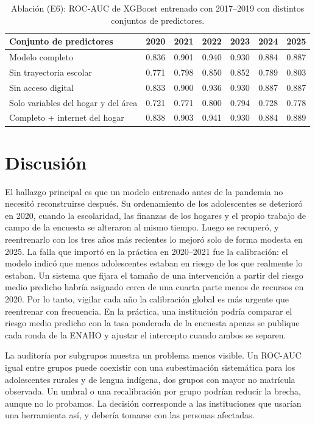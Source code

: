 \documentclass[conference]{IEEEtran}
\begin{document}
\begin{table}[t]
\caption{Ablación (E6): ROC-AUC de XGBoost entrenado con 2017--2019 con distintos conjuntos de predictores.}
\label{tab:abl}
\centering
\setlength{\tabcolsep}{2.4pt}
\scriptsize
\begin{tabular}{lcccccc}
\toprule
Conjunto de predictores & 2020 & 2021 & 2022 & 2023 & 2024 & 2025 \\
\midrule
Modelo completo & 0.836 & 0.901 & 0.940 & 0.930 & 0.884 & 0.887 \\
Sin trayectoria escolar & 0.771 & 0.798 & 0.850 & 0.852 & 0.789 & 0.803 \\
Sin acceso digital & 0.833 & 0.900 & 0.936 & 0.930 & 0.887 & 0.887 \\
Solo variables del hogar y del área & 0.721 & 0.771 & 0.800 & 0.794 & 0.728 & 0.778 \\
Completo + internet del hogar & 0.838 & 0.903 & 0.941 & 0.930 & 0.884 & 0.889 \\
\bottomrule
\end{tabular}
\end{table}

\section{Discusión}

El hallazgo principal es que un modelo entrenado antes de la pandemia no necesitó reconstruirse después. Su ordenamiento de los adolescentes se deterioró en 2020, cuando la escolaridad, las finanzas de los hogares y el propio trabajo de campo de la encuesta se alteraron al mismo tiempo. Luego se recuperó, y reentrenarlo con los tres años más recientes lo mejoró solo de forma modesta en 2025. La falla que importó en la práctica en 2020--2021 fue la calibración: el modelo indicó que menos adolescentes estaban en riesgo de los que realmente lo estaban. Un sistema que fijara el tamaño de una intervención a partir del riesgo medio predicho habría asignado cerca de una cuarta parte menos de recursos en 2020. Por lo tanto, vigilar cada año la calibración global es más urgente que reentrenar con frecuencia. En la práctica, una institución podría comparar el riesgo medio predicho con la tasa ponderada de la encuesta apenas se publique cada ronda de la ENAHO y ajustar el intercepto cuando ambos se separen.

La auditoría por subgrupos muestra un problema menos visible. Un ROC-AUC igual entre grupos puede coexistir con una subestimación sistemática para los adolescentes rurales y de lengua indígena, dos grupos con mayor no matrícula observada. Un umbral o una recalibración por grupo podrían reducir la brecha, aunque no lo probamos. La decisión corresponde a las instituciones que usarían una herramienta así, y debería tomarse con las personas afectadas.
\end{document}
